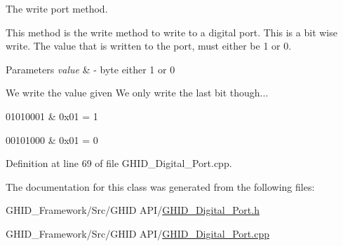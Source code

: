 \-The write port method. 

\-This method is the write method to write to a digital port. \-This is a bit wise write. \-The value that is written to the port, must either be 1 or 0.


\begin{DoxyParams}{\-Parameters}
{\em value} & -\/ byte either 1 or 0 \\
\hline
\end{DoxyParams}
\-We write the value given \-We only write the last bit though...
\begin{DoxyItemize}
\item 01010001 \& 0x01 = 1
\item 00101000 \& 0x01 = 0 
\end{DoxyItemize}

\-Definition at line 69 of file \-G\-H\-I\-D\-\_\-\-Digital\-\_\-\-Port.\-cpp.



\-The documentation for this class was generated from the following files\-:\begin{DoxyCompactItemize}
\item 
\-G\-H\-I\-D\-\_\-\-Framework/\-Src/\-G\-H\-I\-D A\-P\-I/\hyperlink{_g_h_i_d___digital___port_8h}{\-G\-H\-I\-D\-\_\-\-Digital\-\_\-\-Port.\-h}\item 
\-G\-H\-I\-D\-\_\-\-Framework/\-Src/\-G\-H\-I\-D A\-P\-I/\hyperlink{_g_h_i_d___digital___port_8cpp}{\-G\-H\-I\-D\-\_\-\-Digital\-\_\-\-Port.\-cpp}\end{DoxyCompactItemize}
